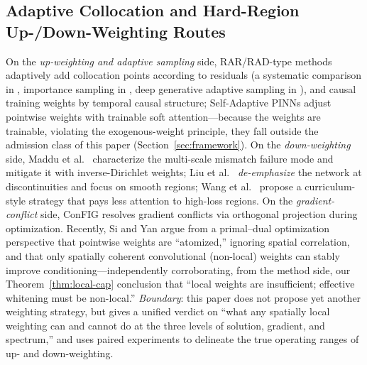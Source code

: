 \documentclass[11pt]{article}
\numberwithin{equation}{section}
\begin{document}
\subsection{Adaptive Collocation and Hard-Region Up-/Down-Weighting Routes}\label{sec:rel-weight}
On the \emph{up-weighting and adaptive sampling} side, RAR/RAD-type methods adaptively add collocation points according to residuals (a systematic comparison in \cite{Wu2022}, importance sampling in \cite{Nabian2021}, deep generative adaptive sampling in \cite{TangDAS2023}), and causal training \cite{Wang2022causal} weights by temporal causal structure; Self-Adaptive PINNs \cite{McClenny2020} adjust pointwise weights with trainable soft attention---because the weights are trainable, violating the exogenous-weight principle, they fall outside the admission class of this paper (Section~\ref{sec:framework}). On the \emph{down-weighting} side, Maddu et al.\ \cite{Maddu2021} characterize the multi-scale mismatch failure mode and mitigate it with inverse-Dirichlet weights; Liu et al.\ \cite{Liu2022down} \emph{de-emphasize} the network at discontinuities and focus on smooth regions; Wang et al.\ \cite{LessEmphasis2022} propose a curriculum-style strategy that pays less attention to high-loss regions. On the \emph{gradient-conflict} side, ConFIG \cite{ConFIG2025} resolves gradient conflicts via orthogonal projection during optimization. Recently, Si and Yan \cite{SiYan2025} argue from a primal--dual optimization perspective that pointwise weights are ``atomized,'' ignoring spatial correlation, and that only spatially coherent convolutional (non-local) weights can stably improve conditioning---independently corroborating, from the method side, our Theorem~\ref{thm:local-cap} conclusion that ``local weights are insufficient; effective whitening must be non-local.'' \emph{Boundary}: this paper does not propose yet another weighting strategy, but gives a unified verdict on ``what any spatially local weighting can and cannot do at the three levels of solution, gradient, and spectrum,'' and uses paired experiments to delineate the true operating ranges of up- and down-weighting.
\end{document}
